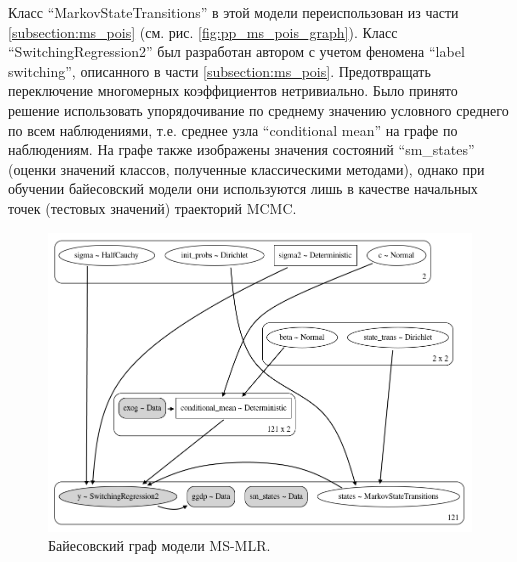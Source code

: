 \documentclass[a4paper,14pt]{extreport}
\begin{document}
Класс ``MarkovStateTransitions'' в этой модели переиспользован из части \ref{subsection:ms_pois} (см. рис. \ref{fig:pp_ms_pois_graph}). 
Класс ``SwitchingRegression2'' был разработан автором с учетом феномена ``label switching'', описанного в части \ref{subsection:ms_pois}. Предотвращать переключение многомерных коэффициентов нетривиально. Было принято решение использовать упорядочивание по среднему значению условного среднего по всем наблюдениями, т.е. среднее узла ``conditional mean'' на графе по наблюдениям.
На графе также изображены значения состояний ``sm\_states'' (оценки значений классов, полученные классическими методами), однако при обучении байесовский модели они используются лишь в качестве начальных точек (тестовых значений) траекторий MCMC.

\begin{figure}[H]
	\includegraphics[width=\linewidth]{img/manual/pp_ms_arx_graph_man.png}
	\caption{Байесовский граф модели MS-MLR. }
	\label{fig:pp_ms_arx_graph_man}
\end{figure}
\end{document}
